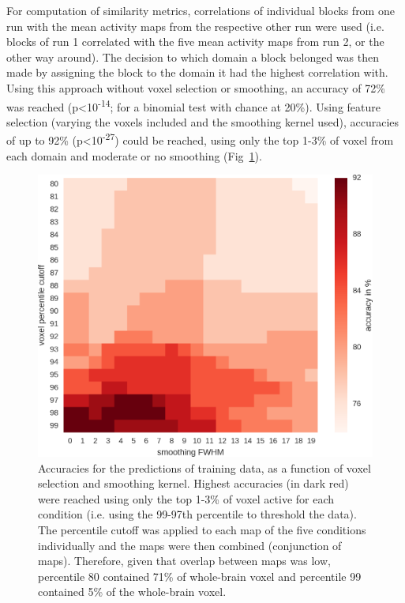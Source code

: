 \documentclass[fleqn,10pt]{SelfArx} %
\begin{document}
For computation of similarity metrics, correlations of individual blocks from one run with the mean activity maps from the respective other run were used (i.e. blocks of run 1 correlated with the five mean activity maps from run 2, or the other way around). The decision to which domain a block belonged was then made by assigning the block to the domain it had the highest correlation with. Using this approach without voxel selection or smoothing, an accuracy of 72\% was reached (p<10\textsuperscript{-14}; for a binomial test with chance at 20\%). Using feature selection (varying the voxels included and the smoothing kernel used), accuracies of up to 92\% (p<10\textsuperscript{-27}) could be reached, using only the top 1-3\% of voxel from each domain and moderate or no smoothing (Fig~\ref{fig:feature}).

\begin{figure}[htbp]
	
	\renewcommand{\familydefault}{\sfdefault}\normalfont
	\centering
	\includegraphics[width=\columnwidth]{./figs/fig3_featureSelection.png}
			\vspace*{-3mm}
	\caption{Accuracies for the predictions of training data, as a function of voxel selection and smoothing kernel. Highest accuracies (in dark red) were reached using only the top 1-3\% of voxel active for each condition (i.e. using the 99-97th percentile to threshold the data). The percentile cutoff was applied to each map of the five conditions individually and the maps were then combined (conjunction of maps). Therefore, given that overlap between maps was low, percentile 80 contained 71\% of whole-brain voxel and percentile 99 contained 5\% of the whole-brain voxel.}%
	\label{fig:feature}
	
\end{figure}
\end{document}
